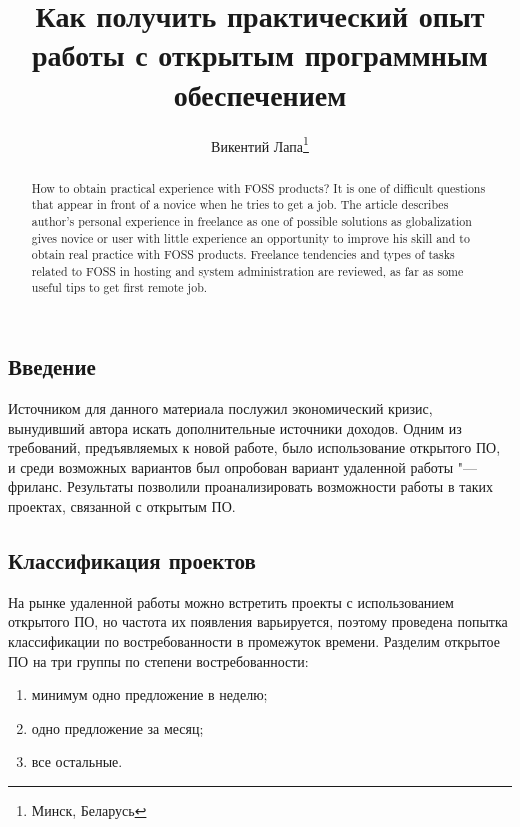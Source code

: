 \documentclass[10pt, a5paper]{article}
\begin{document}
\title{Как получить практический опыт работы с открытым программным обеспечением}%

\author{Викентий Лапа\footnote{Минск, Беларусь}}
\maketitle

\begin{abstract}
How to obtain practical experience with FOSS products? It is one of difficult questions that appear in front of a novice when he tries to get a job. The article describes author's personal experience in freelance as one of possible solutions as globalization gives novice or user with little experience an opportunity to improve his skill and to obtain real practice with FOSS products. Freelance tendencies and types of tasks related to FOSS in hosting and system administration are reviewed, as far as some useful tips  to get first remote job.
\end{abstract}

\subsection*{Введение}

Источником для данного материала послужил экономический кризис, вынудивший автора искать дополнительные источники доходов. Одним из требований, предъявляемых к новой работе, было использование открытого ПО, и среди возможных вариантов был опробован вариант удаленной работы "--- фриланс. Результаты позволили проанализировать возможности работы в таких проектах, связанной с открытым ПО.

\subsection*{Классификация проектов}

На рынке удаленной работы можно встретить проекты с использованием открытого ПО, но частота их появления варьируется, поэтому проведена попытка классификации по востребованности в промежуток времени. 
Разделим открытое ПО на три группы по степени востребованности:

\begin{enumerate}
  \item минимум одно предложение в неделю;
  \item одно предложение за месяц;
  \item все остальные.
\end{enumerate}
\end{document}

